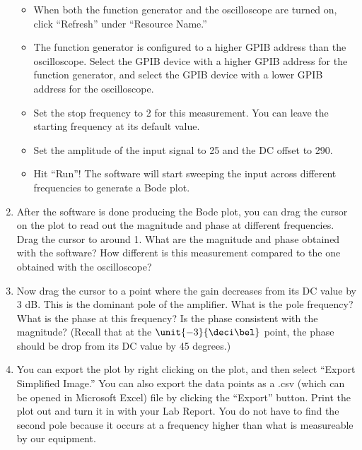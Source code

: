 \documentclass{article}
\begin{document}
\begin{enumerate}
\begin{itemize}
		\item When both the function generator and the oscilloscope are turned on, click ``Refresh'' under ``Resource Name.''

		\item The function generator is configured to a higher GPIB address than the oscilloscope. Select the GPIB device with a higher GPIB address for the function generator, and select the GPIB device with a lower GPIB address for the oscilloscope.

		\item Set the stop frequency to \unit{2}{\mega\hertz} for this measurement. You can leave the starting frequency at its default value.

		\item Set the amplitude of the input signal to \unit{25}{\milli\volt} and the DC offset to \unit{290}{\milli\volt}. 

		\item Hit ``Run''! The software will start sweeping the input across different frequencies to generate a Bode plot.

	\end{itemize}

	\item After the software is done producing the Bode plot, you can drag the cursor on the plot to read out the magnitude and phase at different frequencies. Drag the cursor to around \unit{1}{\kilo\hertz}. What are the magnitude and phase obtained with the software? How different is this measurement compared to the one obtained with the oscilloscope?

	\item Now drag the cursor to a point where the gain decreases from its DC value by 3 dB. This is the dominant pole of the amplifier. What is the pole frequency? What is the phase at this frequency? Is the phase consistent with the magnitude? (Recall that at the $\unit{-3}{\deci\bel}$ point, the phase should be drop from its DC value by 45 degrees.)

	\item You can export the plot by right clicking on the plot, and then select ``Export Simplified Image.'' You can also export the data points as a .csv (which can be opened in Microsoft Excel) file by clicking the ``Export'' button. Print the plot out and turn it in with your Lab Report. You do not have to find the second pole because it occurs at a frequency higher than what is measureable by our equipment.

\end{enumerate}
\end{document}
